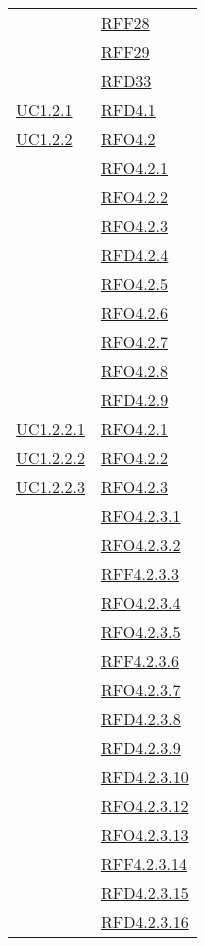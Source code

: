 \begin{longtable}{|>{\centering}m{5cm}|m{5cm}<{\centering}|}
& \hyperlink{RFF28}{RFF28}\\
& \hyperlink{RFF29}{RFF29}\\
& \hyperlink{RFD33}{RFD33}\\ \hline
\hyperref[UC1.2.1]{UC1.2.1} & \hyperlink{RFD4.1}{RFD4.1}\\ \hline
\hyperref[UC1.2.2]{UC1.2.2} & \hyperlink{RFO4.2}{RFO4.2}\\
& \hyperlink{RFO4.2.1}{RFO4.2.1}\\
& \hyperlink{RFO4.2.2}{RFO4.2.2}\\
& \hyperlink{RFO4.2.3}{RFO4.2.3}\\
& \hyperlink{RFD4.2.4}{RFD4.2.4}\\
& \hyperlink{RFO4.2.5}{RFO4.2.5}\\
& \hyperlink{RFO4.2.6}{RFO4.2.6}\\
& \hyperlink{RFO4.2.7}{RFO4.2.7}\\
& \hyperlink{RFO4.2.8}{RFO4.2.8}\\
& \hyperlink{RFD4.2.9}{RFD4.2.9}\\ \hline
\hyperref[UC1.2.2.1]{UC1.2.2.1} & \hyperlink{RFO4.2.1}{RFO4.2.1}\\ \hline
\hyperref[UC1.2.2.2]{UC1.2.2.2} & \hyperlink{RFO4.2.2}{RFO4.2.2}\\ \hline
\hyperref[UC1.2.2.3]{UC1.2.2.3} & \hyperlink{RFO4.2.3}{RFO4.2.3}\\
& \hyperlink{RFO4.2.3.1}{RFO4.2.3.1}\\
& \hyperlink{RFO4.2.3.2}{RFO4.2.3.2}\\
& \hyperlink{RFF4.2.3.3}{RFF4.2.3.3}\\
& \hyperlink{RFO4.2.3.4}{RFO4.2.3.4}\\
& \hyperlink{RFO4.2.3.5}{RFO4.2.3.5}\\
& \hyperlink{RFF4.2.3.6}{RFF4.2.3.6}\\
& \hyperlink{RFO4.2.3.7}{RFO4.2.3.7}\\
& \hyperlink{RFD4.2.3.8}{RFD4.2.3.8}\\
& \hyperlink{RFD4.2.3.9}{RFD4.2.3.9}\\
& \hyperlink{RFD4.2.3.10}{RFD4.2.3.10}\\
& \hyperlink{RFO4.2.3.12}{RFO4.2.3.12}\\
& \hyperlink{RFO4.2.3.13}{RFO4.2.3.13}\\
& \hyperlink{RFF4.2.3.14}{RFF4.2.3.14}\\
& \hyperlink{RFD4.2.3.15}{RFD4.2.3.15}\\
& \hyperlink{RFD4.2.3.16}{RFD4.2.3.16}\\

\end{longtable}
